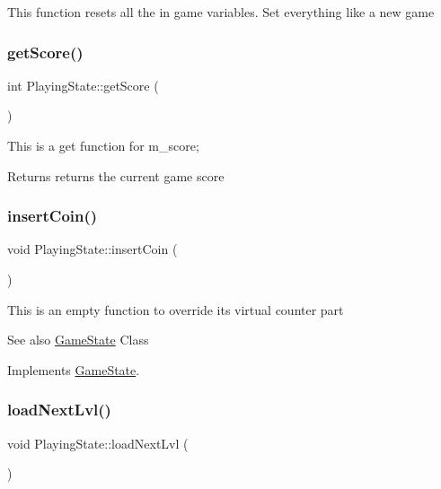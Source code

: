 This function resets all the in game variables. Set everything like a new game \mbox{\label{class_playing_state_ab07b1a4993541b38e81f756ac0f4e46b}} 
\subsubsection{\texorpdfstring{get\+Score()}{getScore()}}
{\footnotesize\ttfamily int Playing\+State\+::get\+Score (\begin{DoxyParamCaption}{ }\end{DoxyParamCaption})}

This is a get function for m\+\_\+score;

\begin{DoxyReturn}{Returns}
returns the current game score 
\end{DoxyReturn}
\mbox{\label{class_playing_state_a936d41a2041ace2ccb67a9b779d113a7}} 
\subsubsection{\texorpdfstring{insert\+Coin()}{insertCoin()}}
{\footnotesize\ttfamily void Playing\+State\+::insert\+Coin (\begin{DoxyParamCaption}{ }\end{DoxyParamCaption})\hspace{0.3cm}{\ttfamily [virtual]}}

This is an empty function to override it\textquotesingle{}s virtual counter part \begin{DoxySeeAlso}{See also}
\hyperlink{class_game_state}{Game\+State} Class 
\end{DoxySeeAlso}


Implements \hyperlink{class_game_state_a4cd6f5b4ad23fc08dca287df26d94b94}{Game\+State}.

\mbox{\label{class_playing_state_a18ea22c1b551f6d81d030853f8ce9b73}} 
\subsubsection{\texorpdfstring{load\+Next\+Lvl()}{loadNextLvl()}}
{\footnotesize\ttfamily void Playing\+State\+::load\+Next\+Lvl (\begin{DoxyParamCaption}{ }\end{DoxyParamCaption})}


